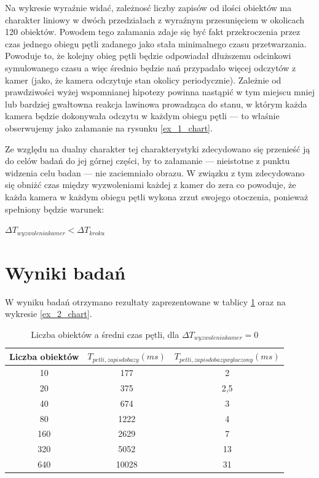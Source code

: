 \par{
Na wykresie wyraźnie widać, zależnosć liczby zapisów od ilości obiektów ma charakter liniowy w dwóch przedziałach z wyraźnym przesunięciem w okolicach 120 obiektów. Powodem tego załamania zdaje się być fakt przekroczenia przez czas jednego obiegu pętli zadanego jako stała minimalnego czasu przetwarzania.  Powoduje to, że kolejny obieg pętli będzie odpowiadał dłuższemu odcinkowi symulowanego czasu a więc średnio będzie nań przypadało więcej odczytów z kamer (jako, że kamera odczytuje stan okolicy periodycznie). Zależnie od prawdziwości wyżej wspomnianej hipotezy powinna nastąpić w tym miejscu mniej lub bardziej gwałtowna reakcja lawinowa prowadząca do stanu, w którym każda kamera będzie dokonywała odczytu w każdym obiegu pętli --- to właśnie obserwujemy jako załamanie na rysunku \ref{ex_1_chart}.
}
\par{
Ze względu na dualny charakter tej charakterystyki zdecydowano się przenieść ją do celów badań do jej górnej części, by to załamanie --- nieistotne z punktu widzenia celu badan --- nie zaciemniało obrazu. W związku z tym zdecydowano się obniżć czas między wyzwoleniami każdej z kamer do zera co powoduje, że każda kamera w każdym obiegu pętli wykona zrzut swojego otoczenia, ponieważ spełniony będzie warunek:
}
\par{
\begin{center}
$\Delta T_{wyzwolenia kamer} < \Delta T_{kroku}$
\end{center}
}

\section{Wyniki badań}
\par{
W wyniku badań otrzymano rezultaty zaprezentowane w tablicy \ref{ex_2} oraz na wykresie \ref{ex_2_chart}.
}

\par{
\begin{table}[t]
\caption{Liczba obiektów a średni czas pętli, dla $\Delta T_{wyzwolenia kamer} = 0$}
\label{ex_2}
\begin{center}
\begin{tabular}{|c|c|c|}
  \hline 
  \textbf{Liczba obiektów} & \textbf{$T_{petli, zapis do bazy} (ms)$} & \textbf{$T_{petli, zapis do bazy wylaczony} (ms)$}\\
  \hline
10 & 177 & 2 \\
20 & 375 & 2,5 \\
40 & 674 & 3 \\
80 & 1222 & 4 \\
160 & 2629 & 7 \\
320 & 5052 & 13 \\
640 & 10028 & 31 \\
  \hline  
\end{tabular}
\end{center}
\end{table}
}

